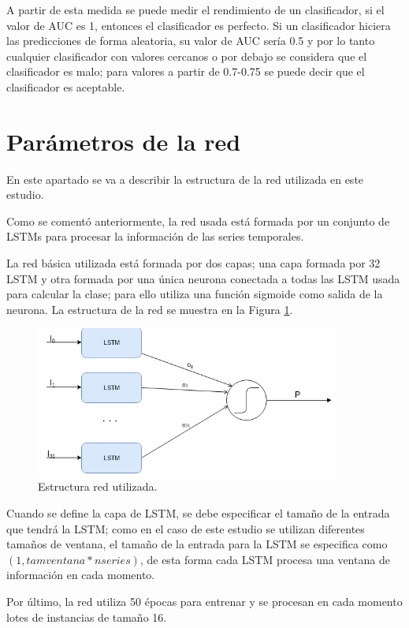 A partir de esta medida se puede medir el rendimiento de un clasificador, si el valor de AUC es 1, entonces el clasificador es perfecto. Si un clasificador hiciera las predicciones de forma aleatoria, su valor de AUC sería 0.5 y por lo tanto cualquier clasificador con valores cercanos o por debajo se considera que el clasificador es malo; para valores a partir de 0.7-0.75 se puede decir que el clasificador es aceptable.

\section{Parámetros de la red}
En este apartado se va a describir la estructura de la red utilizada en este estudio.\newline

Como se comentó anteriormente, la red usada está formada por un conjunto de LSTMs para procesar la información de las series temporales.\newline

La red básica utilizada está formada por dos capas; una capa formada por 32 LSTM y otra formada por una única neurona conectada a todas las LSTM usada para calcular la clase; para ello utiliza una función sigmoide como salida de la neurona. La estructura de la red se muestra en la Figura \ref{fig:63}.\newline

\begin{figure}[H]
	\centering
	\includegraphics[width=100mm]{imagenes/Estructura_Red.png}
	\caption{Estructura red utilizada.}
	\label{fig:63}
\end{figure}
\verticalspace
Cuando se define la capa de LSTM, se debe especificar el tamaño de la entrada que tendrá la LSTM; como en el caso de este estudio se utilizan diferentes tamaños de ventana, el tamaño de la entrada para la LSTM se especifica como $(1, tamventana * nseries )$, de esta forma cada LSTM procesa una ventana de información en cada momento.\newline

Por último, la red utiliza 50 épocas para entrenar y se procesan en cada momento lotes de instancias de tamaño 16.